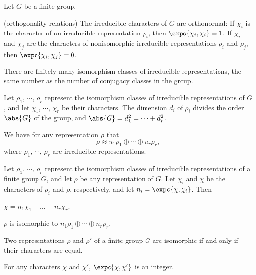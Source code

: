 \documentclass[hidelinks]{article}
\begin{document}
\begin{resume}
    \begin{theorem}
        Let $G$ be a finite group.
        \begin{cenum}
            \item (orthogonality relations) The irreducible characters of $G$ are orthonormal: If $\chi_i$ is the character of an irreducible representation $\rho_i$, then $\expc{\chi_i,\chi_i} = 1$. If $\chi_i$ and $\chi_j$ are the characters of nonisomorphic irreducible representations $\rho_i$ and $\rho_j$, then $\expc{\chi_i,\chi_j} = 0$.
            \item There are finitely many isomorphism classes of irreducible representations, the same number as the number of conjugacy classes in the group.
            \item Let $\rho_1$, $\cdots$, $\rho_r$ represent the isomorphism classes of irreducible representations of $G$, and let $\chi_1$, $\cdots$, $\chi_r$ be their characters. The dimension $d_i$ of $\rho_i$ divides the order $\abs{G}$ of the group, and $\abs{G} = d_1^2 = \cdots + d_r^2$.
        \end{cenum}
    \end{theorem}
\end{resume}
We have for any representation $\rho$ that
\[ \rho \approx n_1 \rho_1 \oplus \cdots \oplus n_r \rho_r, \]
where $\rho_1$, $\cdots$, $\rho_r$ are irreducible representations.
\begin{resume}
    \begin{theorem}
        Let $\rho_1$, $\cdots$, $\rho_r$ represent the isomorphism classes of irreducible representations of a finite group $G$, and let $\rho$ be any representation of $G$. Let $\chi_i$ and $\chi$ be the characters of $\rho_i$ and $\rho$, respectively, and let $n_i = \expc{\chi,\chi_i}$. Then
        \begin{cenum}
            \item $\chi = n_1\chi_1 + \dots + n_r\chi_r$.
            \item $\rho$ is isomorphic to $n_1\rho_1\oplus \cdots \oplus n_r \rho_r$.
            \item Two representations $\rho$ and $\rho'$ of a finite group $G$ are isomorphic if and only if their characters are equal.
        \end{cenum}
    \end{theorem}
\end{resume}
\begin{corollary}
    For any characters $\chi$ and $\chi'$, $\expc{\chi,\chi'}$ is an integer.
\end{corollary}
\end{document}
